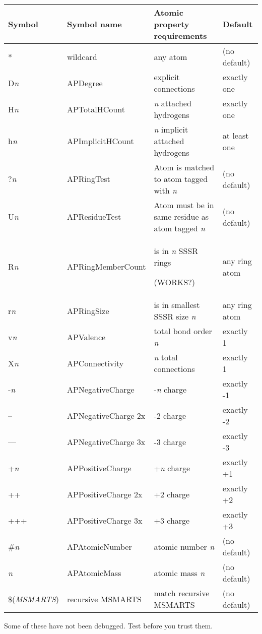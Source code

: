 \begin{itemize}
   	\begin{tabular}{| l | l | l | l |}
	\hline
	Symbol & Symbol name & Atomic property requirements & Default \\ \hline
	* & wildcard & any atom & (no default) \\ \hline
	D\emph{n} & APDegree & explicit connections & exactly one \\ \hline
	H\emph{n} & APTotalHCount& \emph{n} attached hydrogens & exactly one \\ \hline
	h\emph{n} & APImplicitHCount& \emph{n} implicit attached hydrogens & at least one\\ \hline
	?\emph{n} & APRingTest& Atom is matched to atom tagged with \emph{n}& (no default)\\ \hline
	U\emph{n} & APResidueTest& Atom must be in same residue as atom tagged \emph{n}& (no default)\\ \hline
	R\emph{n} & APRingMemberCount & is in \emph{n} SSSR rings \par(WORKS?)& any ring atom\\ \hline
	r\emph{n} & APRingSize & is in smallest SSSR size \emph{n} & any ring atom\\ \hline
	v\emph{n} & APValence & total bond order \emph{n} & exactly 1 \\ \hline
	X\emph{n} & APConnectivity& \emph{n} total connections & exactly 1 \\ \hline
	-\emph{n} & APNegativeCharge & -\emph{n} charge & exactly -1 \\ \hline
	-- & APNegativeCharge 2x & -2 charge & exactly -2 \\ \hline
	--- & APNegativeCharge 3x & -3 charge & exactly -3 \\ \hline
	+\emph{n} & APPositiveCharge & +\emph{n} charge & exactly +1 \\ \hline
	++ & APPositiveCharge 2x & +2 charge & exactly +2 \\ \hline
	+++ & APPositiveCharge 3x & +3 charge & exactly +3 \\ \hline
	\#\emph{n} & APAtomicNumber & atomic number \emph{n} & (no default) \\ \hline
	\emph{n} & APAtomicMass & atomic mass \emph{n} & (no default) \\ \hline
	\$(\emph{\tiny MSMARTS}) & recursive MSMARTS & match recursive MSMARTS & (no default) \\ \hline
\end{tabular}

Some of these have not been debugged. Test before you trust them.


\end{itemize}
